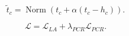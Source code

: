 \[
\widetilde{t}_c = \operatorname{Norm}\left(t_c + \alpha(t_c-h_c)\right).
\]

\[
\mathcal{L} = \mathcal{L}_{LA} + \lambda_{PCR}\mathcal{L}_{PCR}.
\]
